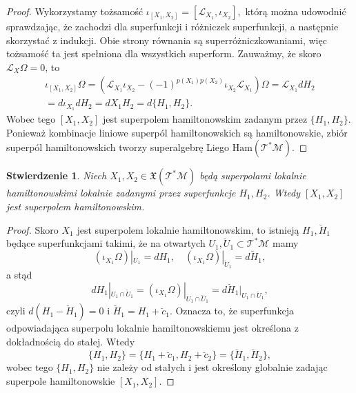 \documentclass[11pt,a4paper]{report}
\newtheorem{proposition}[theorem]{Stwierdzenie}
\theoremstyle{definition}
\begin{document}
\begin{proof}
	Wykorzystamy tożsamość $\iota_{[X_1,X_2]} = [\mathcal{L}_{X_1}, \iota_{X_2}],$ którą można udowodnić sprawdzając, że zachodzi dla superfunkcji i różniczek superfunkcji, a następnie skorzystać z indukcji. Obie strony równania są superróżniczkowaniami, więc tożsamość ta jest spełniona dla wszystkich superform.
	Zauważmy, że skoro $\mathcal{L}_X \Omega = 0$, to
	\begin{equation*}
		\begin{gathered}
			\iota_{[X_1,X_2]}\Omega=(\mathcal{L}_{X_1}\iota_{X_2}-(-1)^{p(X_1)p(X_2)}\iota_{X_2}\mathcal{L}_{X_1})\Omega  = \mathcal{L}_{X_1} dH_2 \\
			= d \iota_{X_1} dH_2 = dX_1H_2=d\{H_1,H_2\}.
		\end{gathered}
	\end{equation*}
	Wobec tego $[X_1, X_2]$ jest superpolem hamiltonowskim zadanym przez $\{ H_1, H_2 \}.$ Ponieważ kombinacje liniowe superpól hamiltonowskich są hamiltonowskie, zbiór superpól hamiltonowskich tworzy superalgebrę Liego $\mathrm{Ham}(\mathcal{T^*M}).$
\end{proof}
			      				
\begin{proposition}
	Niech $X_1, X_2\in \mathfrak{X}(\mathcal{T^*M})$ będą superpolami lokalnie hamiltonowskimi lokalnie zadanymi przez superfunkcje $H_1, H_2$. Wtedy $[X_1, X_2]$ jest superpolem hamiltonowskim.
\end{proposition}
			      				
\begin{proof}
	Skoro $X_1$ jest superpolem lokalnie hamiltonowskim, to istnieją $H_1, \breve{H}_1$ będące superfunkcjami takimi, że na otwartych $U_1, \breve{U}_1 \subset \mathcal{T^*M}$ mamy
	\begin{equation*}
		\left( \iota_{X_1} \Omega \right) |_{U_1} = dH_1, \quad 
		\left( \iota_{X_1} \Omega \right) |_{\breve{U}_1} = d\breve{H}_1,
	\end{equation*}
	a stąd
	\begin{equation*}
		dH_1|_{U_1 \cap \breve{U}_1} = \left( \iota_{X_1} \Omega \right) |_{U_1 \cap \breve{U}_1} = d\breve{H}_1|_{U_1 \cap \breve{U}_1},
	\end{equation*}
	czyli $d(H_1 - \breve{H}_1) = 0$ i $\breve{H}_1 = H_1 + \breve{c}_1$. Oznacza to, że superfunkcja odpowiadająca superpolu lokalnie hamiltonowskiemu jest określona z dokładnością do stałej. Wtedy
	\begin{equation*}
		\{ H_1, H_2 \} = \{ H_1 + \breve{c}_1, H_2 + \breve{c}_2 \} = \{ \breve{H}_1, \breve{H}_2 \},
	\end{equation*}
	wobec tego $\{ H_1, H_2 \}$ nie zależy od stałych i jest określony globalnie zadając superpole hamiltonowskie $[X_1, X_2]$.
\end{proof}
			      				
\end{document}
